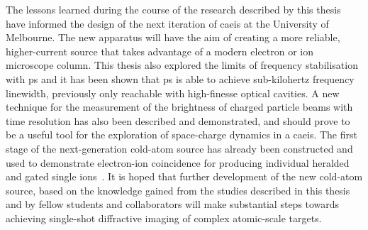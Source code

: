 The lessons learned during the course of the research described by this thesis have informed the design of the next iteration of \gls{caeis} at the University of Melbourne.
The new apparatus will have the aim of creating a more reliable, higher-current source that takes advantage of a modern electron or ion microscope column.
This thesis also explored the limits of frequency stabilisation with \gls{ps} and it has been shown that \gls{ps} is able to achieve sub-kilohertz frequency linewidth, previously only reachable with high-finesse optical cavities.
A new technique for the measurement of the brightness of charged particle beams with time resolution has also been described and demonstrated, and should prove to be a useful tool for the exploration of space-charge dynamics in a \gls{caeis}.
The first stage of the next-generation cold-atom source has already been constructed and used to demonstrate electron-ion coincidence for producing individual heralded and gated single ions~\cite{mcculloch_heralded_2018}.
It is hoped that further development of the new cold-atom source, based on the knowledge gained from the studies described in this thesis and by fellow students and collaborators will make substantial steps towards achieving single-shot diffractive imaging of complex atomic-scale targets.